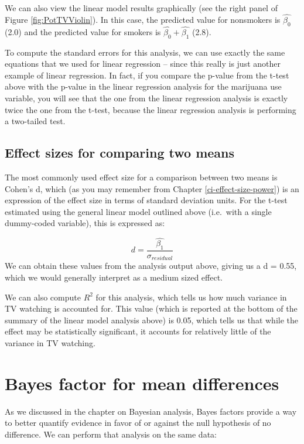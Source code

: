 \documentclass[12pt,]{book}
\theoremstyle{definition}
\theoremstyle{definition}
\theoremstyle{definition}
\theoremstyle{remark}
\begin{document}
We can also view the linear model results graphically (see the right panel of Figure \ref{fig:PotTVViolin}). In this case, the predicted value for nonsmokers is \(\hat{\beta_0}\) (2.0) and the predicted value for smokers is \(\hat{\beta_0} +\hat{\beta_1}\) (2.8).

To compute the standard errors for this analysis, we can use exactly the same equations that we used for linear regression -- since this really is just another example of linear regression. In fact, if you compare the p-value from the t-test above with the p-value in the linear regression analysis for the marijuana use variable, you will see that the one from the linear regression analysis is exactly twice the one from the t-test, because the linear regression analysis is performing a two-tailed test.

\hypertarget{effect-sizes-for-comparing-two-means}{%
\subsection{Effect sizes for comparing two means}\label{effect-sizes-for-comparing-two-means}}

The most commonly used effect size for a comparison between two means is Cohen's d, which (as you may remember from Chapter \ref{ci-effect-size-power}) is an expression of the effect size in terms of standard deviation units. For the t-test estimated using the general linear model outlined above (i.e.~with a single dummy-coded variable), this is expressed as:

\[
d = \frac{\hat{\beta_1}}{\sigma_{residual}}
\]
We can obtain these values from the analysis output above, giving us a d = 0.55, which we would generally interpret as a medium sized effect.

We can also compute \(R^2\) for this analysis, which tells us how much variance in TV watching is accounted for. This value (which is reported at the bottom of the summary of the linear model analysis above) is 0.05, which tells us that while the effect may be statistically significant, it accounts for relatively little of the variance in TV watching.

\hypertarget{bayes-factor-for-mean-differences}{%
\section{Bayes factor for mean differences}\label{bayes-factor-for-mean-differences}}

As we discussed in the chapter on Bayesian analysis, Bayes factors provide a way to better quantify evidence in favor of or against the null hypothesis of no difference. We can perform that analysis on the same data:
\end{document}
